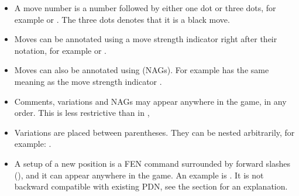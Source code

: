 \documentclass[letterpaper,10pt,english]{sphinxmanual}
\begin{document}
\begin{itemize}
\item {} 
\sphinxAtStartPar
A move number is a number followed by either one dot or three dots, for example  or
. The three dots denotes that it is a black move.

\item {} 
\sphinxAtStartPar
Moves can be annotated using a move strength indicator right after their notation, for example  or .

\item {} 
\sphinxAtStartPar
Moves can also be annotated using 
(NAGs). For example  has the same meaning as the move strength indicator \sphinxcode{\sphinxupquote{!}}.

\item {} 
\sphinxAtStartPar
Comments, variations and NAGs may appear anywhere in the game, in any order. This is less
restrictive than in ,

\item {} 
\sphinxAtStartPar
Variations are placed between parentheses. They can be nested arbitrarily, for example:
.

\item {} 
\sphinxAtStartPar
A setup of a new position is a FEN command surrounded by forward slashes (\sphinxcode{\sphinxupquote{/}}), and it can appear
anywhere in the game. An example is .
It is not backward compatible with existing PDN, see the {\hyperref[\detokenize{extensions:extensions-section}]{}} section
for an explanation.

\end{itemize}
\end{document}
